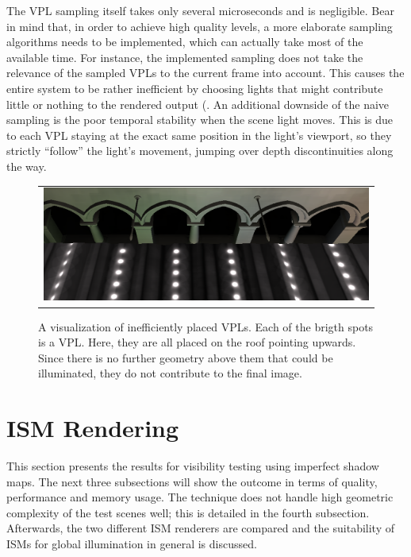 The VPL sampling itself takes only several microseconds and is negligible. Bear in mind that, in order to achieve high quality levels, a more elaborate sampling algorithms needs to be implemented, which can actually take most of the available time. For instance, the implemented sampling does not take the relevance of the sampled VPLs to the current frame into account. This causes the entire system to be rather inefficient by choosing lights that might contribute little or nothing to the rendered output (. An additional downside of the naive sampling is the poor temporal stability when the scene light moves. This is due to each VPL staying at the exact same position in the light's viewport, so they strictly ``follow'' the light's movement, jumping over depth discontinuities along the way.

\begin{figure}[htb]
\centering
  \begin{tabular}{@{}c@{}}
    \includegraphics[width=1.0\textwidth]{screenshots/RSM_unfavorable} \\
  \end{tabular}
  \caption{A visualization of inefficiently placed VPLs. Each of the brigth spots is a VPL. Here, they are all placed on the roof pointing upwards. Since there is no further geometry above them that could be illuminated, they do not contribute to the final image.}
  \label{fig:results:RSMUnfavorable}
\end{figure}




\section{ISM Rendering}
\label{sec:results:ism}

This section presents the results for visibility testing using imperfect shadow maps. The next three subsections will show the outcome in terms of quality, performance and memory usage. The technique does not handle high geometric complexity of the test scenes well; this is detailed in the fourth subsection. Afterwards, the two different ISM renderers are compared and the suitability of ISMs for global illumination in general is discussed.


